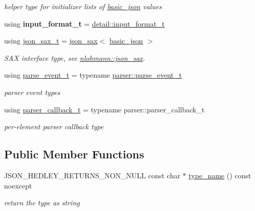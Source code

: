 \begin{DoxyCompactItemize}
\begin{DoxyCompactList}\small\item\em helper type for initializer lists of \mbox{\hyperlink{classnlohmann_1_1basic__json}{basic\+\_\+json}} values \end{DoxyCompactList}\item 
\mbox{\label{classnlohmann_1_1basic__json_a2ddbac818a4c84a7377b1bbd25363588}} 
using {\bfseries input\+\_\+format\+\_\+t} = \mbox{\hyperlink{namespacenlohmann_1_1detail_aa554fc6a11519e4f347deb25a9f0db40}{detail\+::input\+\_\+format\+\_\+t}}
\item 
\mbox{\label{classnlohmann_1_1basic__json_aa865c3eb68b6ebdd647173774d2b5cdb}} 
using \mbox{\hyperlink{classnlohmann_1_1basic__json_aa865c3eb68b6ebdd647173774d2b5cdb}{json\+\_\+sax\+\_\+t}} = \mbox{\hyperlink{structnlohmann_1_1json__sax}{json\+\_\+sax}}$<$ \mbox{\hyperlink{classnlohmann_1_1basic__json}{basic\+\_\+json}} $>$
\begin{DoxyCompactList}\small\item\em S\+AX interface type, see \mbox{\hyperlink{structnlohmann_1_1json__sax}{nlohmann\+::json\+\_\+sax}}. \end{DoxyCompactList}\item 
using \mbox{\hyperlink{classnlohmann_1_1basic__json_aaceba2e4cf75fc983bb75c78c8742e65}{parse\+\_\+event\+\_\+t}} = typename \mbox{\hyperlink{classnlohmann_1_1detail_1_1parser_a37ac88c864dda495f72cb62776b0bebe}{parser\+::parse\+\_\+event\+\_\+t}}
\begin{DoxyCompactList}\small\item\em parser event types \end{DoxyCompactList}\item 
using \mbox{\hyperlink{classnlohmann_1_1basic__json_ab4f78c5f9fd25172eeec84482e03f5b7}{parser\+\_\+callback\+\_\+t}} = typename parser\+::parser\+\_\+callback\+\_\+t
\begin{DoxyCompactList}\small\item\em per-\/element parser callback type \end{DoxyCompactList}\end{DoxyCompactItemize}
\subsection*{Public Member Functions}
\begin{DoxyCompactItemize}
\item 
J\+S\+O\+N\+\_\+\+H\+E\+D\+L\+E\+Y\+\_\+\+R\+E\+T\+U\+R\+N\+S\+\_\+\+N\+O\+N\+\_\+\+N\+U\+LL const char $\ast$ \mbox{\hyperlink{classnlohmann_1_1basic__json_a9d75f6b5393b23a683d69605f9fb1f55}{type\+\_\+name}} () const noexcept
\begin{DoxyCompactList}\small\item\em return the type as string \end{DoxyCompactList}\end{DoxyCompactItemize}
